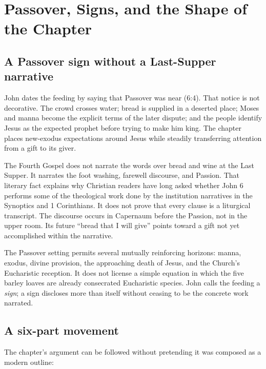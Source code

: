 \section{Passover, Signs, and the Shape of the Chapter}

\subsection{A Passover sign without a Last-Supper narrative}

John dates the feeding by saying that Passover was near (6:4). That notice is
not decorative. The crowd crosses water; bread is supplied in a deserted place;
Moses and manna become the explicit terms of the later dispute; and the people
identify Jesus as the expected prophet before trying to make him king. The
chapter places new-exodus expectations around Jesus while steadily transferring
attention from a gift to its giver.

The Fourth Gospel does not narrate the words over bread and wine at the Last
Supper. It narrates the foot washing, farewell discourse, and Passion. That
literary fact explains why Christian readers have long asked whether John 6
performs some of the theological work done by the institution narratives in
the Synoptics and 1 Corinthians. It does not prove that every clause is a
liturgical transcript. The discourse occurs in Capernaum before the Passion,
not in the upper room. Its future ``bread that I will give'' points toward a
gift not yet accomplished within the narrative.

The Passover setting permits several mutually reinforcing horizons: manna,
exodus, divine provision, the approaching death of Jesus, and the Church's
Eucharistic reception. It does not license a simple equation in which the five
barley loaves are already consecrated Eucharistic species. John calls the
feeding a \emph{sign}; a sign discloses more than itself without ceasing to be
the concrete work narrated.

\subsection{A six-part movement}

The chapter's argument can be followed without pretending it was composed as a
modern outline:

